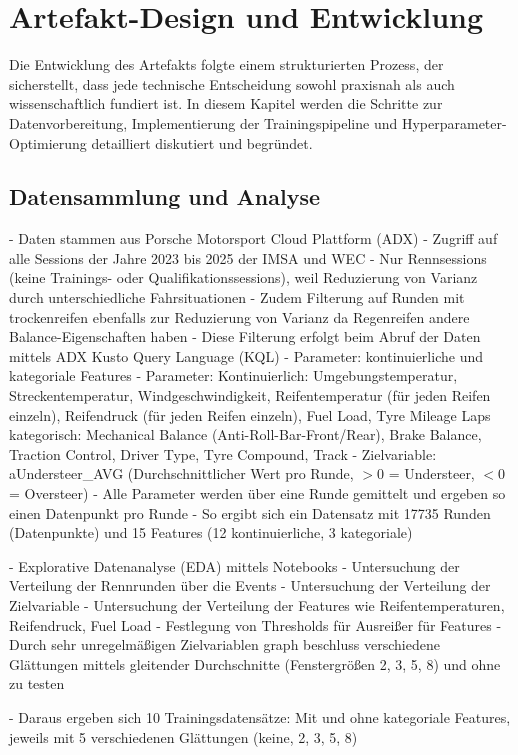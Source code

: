 \chapter{Artefakt-Design und Entwicklung}

Die Entwicklung des Artefakts folgte einem strukturierten Prozess, der sicherstellt, dass jede technische Entscheidung sowohl praxisnah als auch wissenschaftlich fundiert ist. In diesem Kapitel werden die Schritte zur Datenvorbereitung, Implementierung der Trainingspipeline und Hyperparameter-Optimierung detailliert diskutiert und begründet.

\section{Datensammlung und Analyse}

- Daten stammen aus Porsche Motorsport Cloud Plattform (ADX)
- Zugriff auf alle Sessions der Jahre 2023 bis 2025 der IMSA und WEC 
- Nur Rennsessions (keine Trainings- oder Qualifikationssessions), weil Reduzierung von Varianz durch unterschiedliche Fahrsituationen
- Zudem Filterung auf Runden mit trockenreifen ebenfalls zur Reduzierung von Varianz da Regenreifen andere Balance-Eigenschaften haben
- Diese Filterung erfolgt beim Abruf der Daten mittels ADX Kusto Query Language (KQL)
- Parameter: kontinuierliche und kategoriale Features
- Parameter: 
Kontinuierlich: Umgebungstemperatur, Streckentemperatur, Windgeschwindigkeit, Reifentemperatur (für jeden Reifen einzeln), Reifendruck (für jeden Reifen einzeln), Fuel Load, Tyre Mileage Laps
kategorisch: Mechanical Balance (Anti-Roll-Bar-Front/Rear), Brake Balance, Traction Control, Driver Type, Tyre Compound, Track
- Zielvariable: aUndersteer\_AVG (Durchschnittlicher Wert pro Runde, $>0$ = Understeer, $<0$ = Oversteer)
- Alle Parameter werden über eine Runde gemittelt und ergeben so einen Datenpunkt pro Runde
- So ergibt sich ein Datensatz mit 17735 Runden (Datenpunkte) und 15 Features (12 kontinuierliche, 3 kategoriale)

- Explorative Datenanalyse (EDA) mittels Notebooks
- Untersuchung der Verteilung der Rennrunden über die Events
- Untersuchung der Verteilung der Zielvariable
- Untersuchung der Verteilung der Features wie Reifentemperaturen, Reifendruck, Fuel Load
- Festlegung von Thresholds für Ausreißer für Features
- Durch sehr unregelmäßigen Zielvariablen graph beschluss verschiedene Glättungen mittels gleitender Durchschnitte (Fenstergrößen 2, 3, 5, 8) und ohne zu testen

- Daraus ergeben sich 10 Trainingsdatensätze: Mit und ohne kategoriale Features, jeweils mit 5 verschiedenen Glättungen (keine, 2, 3, 5, 8)


